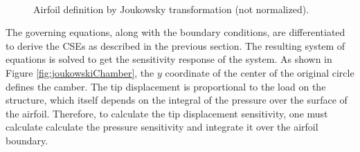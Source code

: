 \documentclass[12pt]{aiaa-pretty}
\begin{document}
%
	\begin{figure}[H]
		\centering
		\quad
		\\
		\quad
		\caption{Airfoil definition by Joukowsky transformation (not normalized).}
		\label{fig:flowOverAirfoil}
	\end{figure}
%

The governing equations, along with the boundary conditions, are differentiated to derive the CSEs as described in the previous section. The resulting system of equations is solved to get the sensitivity response of the system. As shown in Figure \ref{fig:joukowskiChamber}, the $y$ coordinate of the center of the original circle defines the camber. The tip displacement is proportional to the load on the structure, which itself depends on the integral of the pressure over the surface of the airfoil. Therefore, to calculate the tip displacement sensitivity, one must calculate calculate the pressure sensitivity and integrate it over the airfoil boundary.
\end{document}
